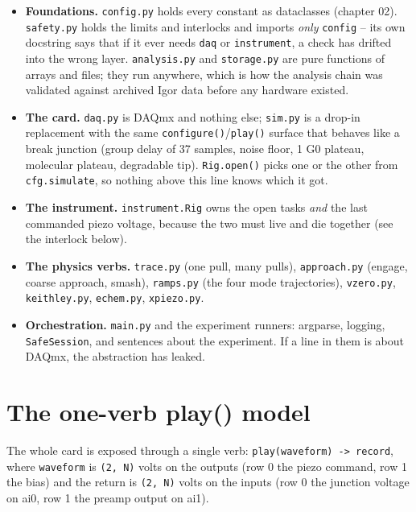 \begin{itemize}[leftmargin=*]
\item \textbf{Foundations.} \texttt{config.\discretionary{}{}{}py} holds every constant as dataclasses (chapter 02). \texttt{safety.\discretionary{}{}{}py} holds the limits and interlocks and imports \emph{only} \texttt{config} -- its own docstring says that if it ever needs \texttt{daq} or \texttt{instrument}, a check has drifted into the wrong layer. \texttt{analysis.\discretionary{}{}{}py} and \texttt{storage.\discretionary{}{}{}py} are pure functions of arrays and files; they run anywhere, which is how the analysis chain was validated against archived Igor data before any hardware existed.
\item \textbf{The card.} \texttt{daq.\discretionary{}{}{}py} is DAQmx and nothing else; \texttt{sim.\discretionary{}{}{}py} is a drop-in replacement with the same \texttt{configure()}/\texttt{play()} surface that behaves like a break junction (group delay of 37 samples, noise floor, 1 G0 plateau, molecular plateau, degradable tip). \texttt{Rig.\discretionary{}{}{}open()} picks one or the other from \texttt{cfg.\discretionary{}{}{}simulate}, so nothing above this line knows which it got.
\item \textbf{The instrument.} \texttt{instrument.\discretionary{}{}{}Rig} owns the open tasks \emph{and} the last commanded piezo voltage, because the two must live and die together (see the interlock below).
\item \textbf{The physics verbs.} \texttt{trace.\discretionary{}{}{}py} (one pull, many pulls), \texttt{approach.\discretionary{}{}{}py} (engage, coarse approach, smash), \texttt{ramps.\discretionary{}{}{}py} (the four mode trajectories), \texttt{vzero.\discretionary{}{}{}py}, \texttt{keithley.\discretionary{}{}{}py}, \texttt{echem.\discretionary{}{}{}py}, \texttt{xpiezo.\discretionary{}{}{}py}.
\item \textbf{Orchestration.} \texttt{main.\discretionary{}{}{}py} and the experiment runners: argparse, logging, \texttt{Safe\discretionary{}{}{}Session}, and sentences about the experiment. If a line in them is about DAQmx, the abstraction has leaked.
\end{itemize}

\section{The one-verb play() model}

The whole card is exposed through a single verb: \texttt{play(waveform) -> record}, where \texttt{waveform} is \texttt{(2,\discretionary{}{}{} N)} volts on the outputs (row 0 the piezo command, row 1 the bias) and the return is \texttt{(2,\discretionary{}{}{} N)} volts on the inputs (row 0 the junction voltage on ai0, row 1 the preamp output on ai1).

